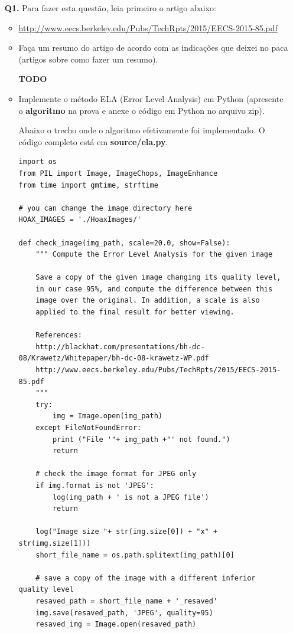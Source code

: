 \documentclass[12pt]{article}
\begin{document}
\begin{itemize}
\item[{\bf Q1.}] Para fazer esta questão, leia primeiro o artigo abaixo:
\begin{itemize}
\item \url{http://www.eecs.berkeley.edu/Pubs/TechRpts/2015/EECS-2015-85.pdf}
\end{itemize} 
\begin{itemize}
\item Faça um resumo do artigo de acordo com as indicações que deixei no paca (artigos sobre como fazer um resumo).

\textbf{TODO}

\item Implemente o método ELA (Error Level Analysis) em Python (apresente o 
\textbf{algoritmo} na prova e anexe o código em Python no arquivo zip).

Abaixo o trecho onde o algoritmo efetivamente foi implementado. O código completo está em \textbf{source/ela.py}.
    
\begin{lstlisting}[basicstyle=\ttfamily]
import os
from PIL import Image, ImageChops, ImageEnhance
from time import gmtime, strftime

# you can change the image directory here
HOAX_IMAGES = './HoaxImages/'

def check_image(img_path, scale=20.0, show=False):
    """ Compute the Error Level Analysis for the given image
    
    Save a copy of the given image changing its quality level,
    in our case 95%, and compute the difference between this 
    image over the original. In addition, a scale is also 
    applied to the final result for better viewing.
    
    References: 
    http://blackhat.com/presentations/bh-dc-08/Krawetz/Whitepaper/bh-dc-08-krawetz-WP.pdf
    http://www.eecs.berkeley.edu/Pubs/TechRpts/2015/EECS-2015-85.pdf
    """
    try:
        img = Image.open(img_path)
    except FileNotFoundError:
        print ("File '"+ img_path +"' not found.")
        return
    
    # check the image format for JPEG only
    if img.format is not 'JPEG':
        log(img_path + ' is not a JPEG file')
        return

    log("Image size "+ str(img.size[0]) + "x" + str(img.size[1]))
    short_file_name = os.path.splitext(img_path)[0]
    
    # save a copy of the image with a different inferior quality level
    resaved_path = short_file_name + '_resaved'
    img.save(resaved_path, 'JPEG', quality=95)
    resaved_img = Image.open(resaved_path)
    

\end{lstlisting}
\end{itemize}
\end{itemize}
\end{document}

